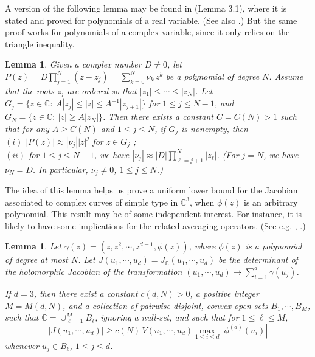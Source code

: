 \documentclass[11 pt]{amsart}
\theoremstyle{plain}
\newtheorem{lem}[theorem]{Lemma}
\numberwithin{equation}{section}
\theoremstyle{plain}
\numberwithin{equation}{section}
\theoremstyle{remark}
\begin{document}
A version of the following lemma may be found in \cite{FW} (Lemma 3.1), where it is stated and proved for polynomials of a real variable. (See also \cite{CRW, CRW2}.) But the same proof works for polynomials of a complex variable, since it only relies on the triangle inequality.
\begin{lem}\label{Gap-dyadic}
Given a complex number $D\not=0$, let $P(z) = D \prod_{j=1}^N (z-z_j) = \sum_{k=0}^N \nu_k \,z^k$ be a polynomial of degree $N$. Assume that the roots $z_j$ are ordered so that $|z_1| \le \cdots \le |z_N|$. Let $G_j =\{ z\in {{\mathbb {C}}}: ~ A|z_j| \le |z| \le A^{-1} |z_{j+1}|\}$ for $1\le j\le N-1$, and $G_N = \{ z\in {{\mathbb {C}}}: ~ |z| \ge A|z_N|\}$. Then there exists a constant $C=C(N)>1$ such that for any $A\ge C(N)$ and $1\le j\le N$, if $G_j$ is nonempty, then
\\
$(i)$ $|P(z)| \approx |\nu_j| |z|^j$ for $z \in G_j$ ;
\\
$(ii)$ for $1\le j\le N-1$, we have $|\nu_j| \approx |D| \prod_{\ell = j+1}^N |z_\ell|$. (For $j=N$, we have $\nu_N = D$. In particular, $\nu_j \not=0$, $1\le j\le N$.)
\end{lem}

The idea of this lemma helps us prove a uniform lower bound for the Jacobian associated to complex curves of simple type in ${{\mathbb {C}}}^3$, when $\phi(z)$ is an arbitrary polynomial.
This result may be of some independent interest. For instance, it is likely to have some implications for the related averaging operators.
(See e.g. \cite{DLW}, \cite{Sto}.)
\begin{lem}\label{J-simplepoly}
Let $\gamma(z) = (z, z^2,\cdots, z^{d-1}, \phi(z))$, where $\phi(z)$ is a polynomial of degree at most $N$.
Let $J (u_1, \cdots , u_d) = J_{{\mathbb {C}}} (u_1, \cdots , u_d)$ be the determinant of the holomorphic Jacobian of the transformation $(u_1, \cdots , u_d) \mapsto \sum_{i=1}^d \gamma(u_j)$.

If $d=3$, then there exist a constant $c(d, N) > 0$, a positive integer $M= M(d , N)$, and a collection of pairwise disjoint, convex open sets $B_1, \cdots , B_M$,
such that
${{\mathbb {C}}} = \cup_{\ell =1}^M B_\ell$, ignoring a null-set,
and such that for $1\le \ell \le M$,
\begin{equation}\label{Jmax}
|J (u_1, \cdots , u_d)| \ge c(N)\, V(u_1, \cdots , u_d) \max_{1\le i\le d} |\phi^{(d)}(u_i)|
\end{equation}
whenever $u_j \in B_\ell$, $1\le j\le d$.
\end{lem}
\end{document}
